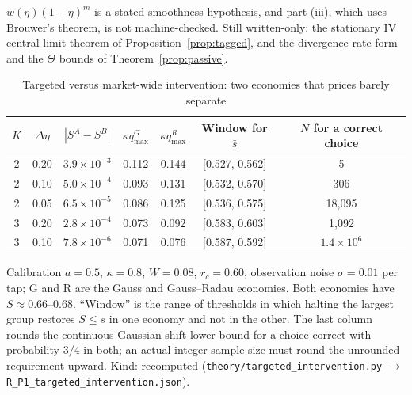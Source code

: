 $w(\eta)(1-\eta)^m$ is a stated smoothness hypothesis, and part (iii), which uses Brouwer's theorem, is not machine-checked. Still written-only: the stationary IV central limit theorem of Proposition~\ref{prop:tagged}, and the divergence-rate form and the $\Theta$ bounds of Theorem~\ref{prop:passive}.

\begin{table}[!htbp]\centering\footnotesize
\begin{threeparttable}
\caption{Targeted versus market-wide intervention: two economies that prices barely separate}\label{tab:target}
\setlength{\tabcolsep}{3pt}
\begin{tabular}{ccccccc}
\toprule
$K$ & $\Delta\eta$ & $|S^A-S^B|$ & $\kappa q^{G}_{\max}$ & $\kappa q^{R}_{\max}$ & Window for $\bar s$ & $N$ for a correct choice\\
\midrule
2 & 0.20 & $3.9\times10^{-3}$ & 0.112 & 0.144 & [0.527, 0.562] & 5\\
2 & 0.10 & $5.0\times10^{-4}$ & 0.093 & 0.131 & [0.532, 0.570] & 306\\
2 & 0.05 & $6.5\times10^{-5}$ & 0.086 & 0.125 & [0.536, 0.575] & 18{,}095\\
3 & 0.20 & $2.8\times10^{-4}$ & 0.073 & 0.092 & [0.583, 0.603] & 1{,}092\\
3 & 0.10 & $7.8\times10^{-6}$ & 0.071 & 0.076 & [0.587, 0.592] & $1.4\times10^{6}$\\
\bottomrule
\end{tabular}
\begin{tablenotes}\footnotesize\item Calibration $a=0.5$, $\kappa=0.8$, $W=0.08$, $r_c=0.60$, observation noise $\sigma=0.01$ per tap; G and R are the Gauss and Gauss--Radau economies. Both economies have $S\approx0.66$--$0.68$. ``Window'' is the range of thresholds in which halting the largest group restores $S\le\bar s$ in one economy and not in the other. The last column rounds the continuous Gaussian-shift lower bound for a choice correct with probability $3/4$ in both; an actual integer sample size must round the unrounded requirement upward. Kind: recomputed (\texttt{theory/targeted\_intervention.py} $\to$ \nolinkurl{R_P1_targeted_intervention.json}).\end{tablenotes}
\end{threeparttable}
\end{table}

